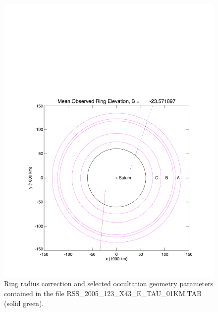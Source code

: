\documentclass[crop=false,class=book]{standalone}
\begin{document}
\begin{figure}[H]
    \centering
    \includegraphics[page=5,trim = {0.8in 0.5in 0.21in 0.45in},clip,width=\textwidth]{Rev007_E_X43_summary_p1_08FEB2018.pdf}
    \caption[Ring Radius Correction from Selected Occultation Geometry]{Ring radius correction and selected occultation geometry parameters contained in the file
RSS\_2005\_123\_X43\_E\_TAU\_01KM.TAB (solid green).}
\end{figure}
\end{document}
